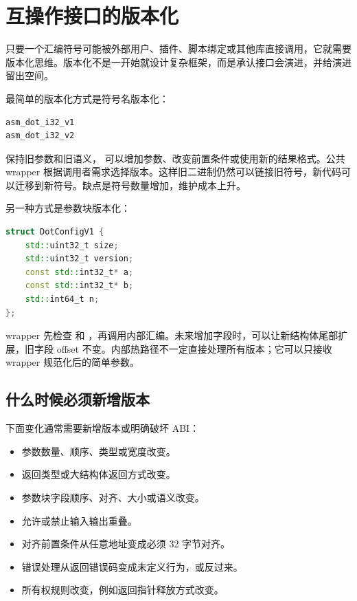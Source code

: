 \section{互操作接口的版本化}

只要一个汇编符号可能被外部用户、插件、脚本绑定或其他库直接调用，它就需要版本化思维。版本化不是一开始就设计复杂框架，而是承认接口会演进，并给演进留出空间。

最简单的版本化方式是符号名版本化：

\begin{lstlisting}
asm_dot_i32_v1
asm_dot_i32_v2
\end{lstlisting}

 保持旧参数和旧语义， 可以增加参数、改变前置条件或使用新的结果格式。公共 wrapper 根据调用者需求选择版本。这样旧二进制仍然可以链接旧符号，新代码可以迁移到新符号。缺点是符号数量增加，维护成本上升。

另一种方式是参数块版本化：

\begin{lstlisting}[language=C++]
struct DotConfigV1 {
    std::uint32_t size;
    std::uint32_t version;
    const std::int32_t* a;
    const std::int32_t* b;
    std::int64_t n;
};
\end{lstlisting}

wrapper 先检查  和 ，再调用内部汇编。未来增加字段时，可以让新结构体尾部扩展，旧字段 offset 不变。内部热路径不一定直接处理所有版本；它可以只接收 wrapper 规范化后的简单参数。

\subsection{什么时候必须新增版本}

下面变化通常需要新增版本或明确破坏 ABI：

\begin{itemize}
  \item 参数数量、顺序、类型或宽度改变。
  \item 返回类型或大结构体返回方式改变。
  \item 参数块字段顺序、对齐、大小或语义改变。
  \item 允许或禁止输入输出重叠。
  \item 对齐前置条件从任意地址变成必须 32 字节对齐。
  \item 错误处理从返回错误码变成未定义行为，或反过来。
  \item 所有权规则改变，例如返回指针释放方式改变。
\end{itemize}

